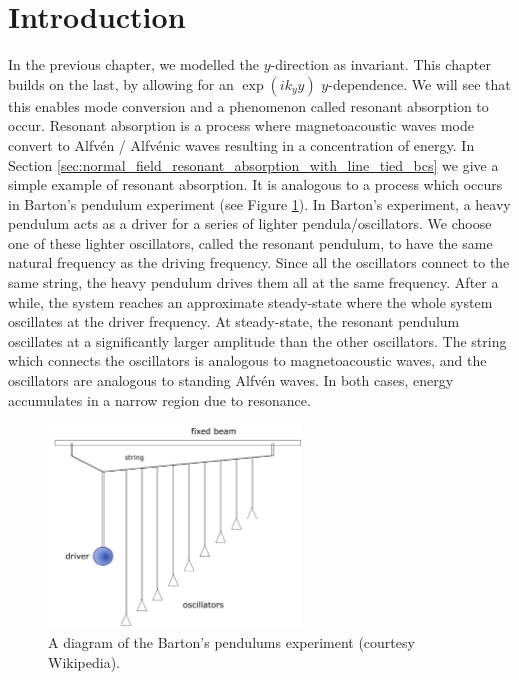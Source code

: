 \section{Introduction}

In the previous chapter, we modelled the $y$-direction as invariant. This chapter builds on the last, by allowing for an $\exp(ik_y y)$  $y$-dependence. We will see that this enables mode conversion and a phenomenon called resonant absorption to occur.
Resonant absorption is a process where magnetoacoustic waves mode convert to Alfv\'en / Alfv\'enic waves resulting in a concentration of energy. In Section \ref{sec:normal_field_resonant_absorption_with_line_tied_bcs} we give a simple example of resonant absorption. It is analogous to a process which occurs in Barton's pendulum experiment (see Figure \ref{fig:bartons_pendulums}). In Barton's experiment, a heavy pendulum acts as a driver for a series of lighter pendula/oscillators. We choose one of these lighter oscillators, called the resonant pendulum, to have the same natural frequency as the driving frequency. Since all the oscillators connect to the same string, the heavy pendulum drives them all at the same frequency. After a while, the system reaches an approximate steady-state where the whole system oscillates at the driver frequency. At steady-state, the resonant pendulum oscillates at a significantly larger amplitude than the other oscillators. The string which connects the oscillators is analogous to magnetoacoustic waves, and the oscillators are analogous to standing Alfv\'en waves. In both cases, energy accumulates in a narrow region due to resonance.

\begin{figure}
    \centering
    \vspace{-20pt}
    \includegraphics[width = 0.6\textwidth]{figures/chapter04/bartons_pendulums.png}
    \vspace{-10pt}
    \caption{A diagram of the Barton's pendulums experiment (courtesy Wikipedia).}
    \vspace{-10pt}
    \label{fig:bartons_pendulums}
\end{figure}

